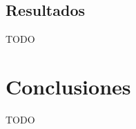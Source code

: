 \documentclass[spanish]{article}
\begin{document}
        
        \subsection{Resultados}
        
            TODO
    
    
    \section{Conclusiones}
        
        TODO  
	
    
    
\end{document}
